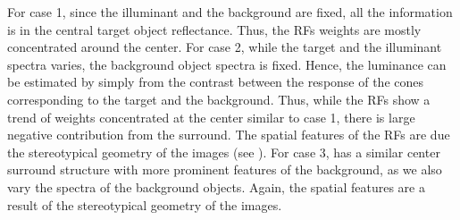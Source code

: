 \documentclass{jov}
\begin{document}
For case 1, since the illuminant and the background are fixed, all the information is in the central target object reflectance. Thus, the RFs weights are mostly concentrated around the center. For case 2, while the target and the illuminant spectra varies, the background object spectra is fixed. Hence, the luminance can be estimated by simply from the contrast between the response of the cones corresponding to the target and the background. Thus, while the RFs show a trend of weights concentrated at the center similar to case 1, there is large negative contribution from the surround. The spatial features of the RFs are due the stereotypical geometry of the images (see ). For case 3, has a similar center surround structure with more prominent features of the background, as we also vary the spectra of the background objects. Again, the spatial features are a result of the stereotypical geometry of the images.
\end{document}
